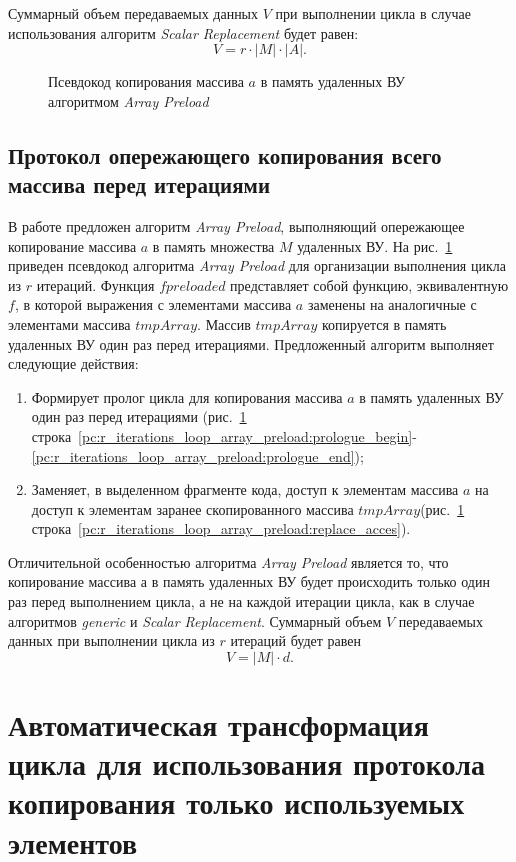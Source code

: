 Суммарный объем передаваемых данных $V$ при выполнении цикла в случае
использования алгоритм \textit{Scalar Replacement} будет равен:
\[ V = r \cdot |M| \cdot |A|. \]

\begin{figure}[!h]
	
    \caption{Псевдокод копирования массива $a$ в память удаленных ВУ алгоритмом
\textit{Array Preload}}
    \label{list:r_iterations_loop_array_preload}
\end{figure}

\subsection{Протокол опережающего копирования всего массива перед итерациями}
В работе предложен алгоритм \textit{Array Preload}, выполняющий опережающее
копирование массива $a$ в память множества $M$ удаленных ВУ. На
рис.~\ref{list:r_iterations_loop_array_preload} приведен псевдокод алгоритма
\textit{Array Preload} для организации выполнения цикла из $r$ итераций.
Функция $fpreloaded$  представляет собой функцию, эквивалентную $f$, в которой
выражения с элементами массива $a$ заменены на аналогичные с элементами
массива $tmpArray$. Массив $tmpArray$ копируется в память
удаленных ВУ один раз перед итерациями.
Предложенный алгоритм выполняет следующие действия:
\begin{enumerate}
\item Формирует пролог цикла для копирования массива $a$ в память удаленных ВУ
один раз перед итерациями (рис.~\ref{list:r_iterations_loop_array_preload}
строка~\ref{pc:r_iterations_loop_array_preload:prologue_begin}-
\ref{pc:r_iterations_loop_array_preload:prologue_end});
\item Заменяет, в выделенном фрагменте кода, доступ к элементам массива $a$ на
доступ к элементам заранее скопированного массива
$tmpArray$(рис.~\ref{list:r_iterations_loop_array_preload}
строка~\ref{pc:r_iterations_loop_array_preload:replace_acces}).
\end{enumerate}

Отличительной особенностью алгоритма \textit{Array Preload} является то, что
копирование массива $а$ в память удаленных ВУ будет происходить только один раз
перед выполнением цикла, а не на каждой итерации цикла, как в случае алгоритмов
\textit{generic} и \textit{Scalar Replacement}. Суммарный объем $V$ передаваемых
данных при выполнении цикла из $r$ итераций будет равен
\[ V= |M| \cdot d. \]

\section{Автоматическая трансформация цикла для использования протокола
  копирования только используемых элементов} \label{sect4_1}


